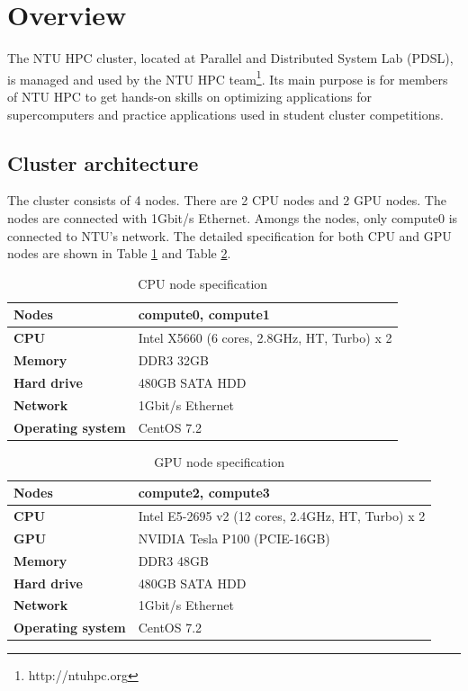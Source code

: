 \section{Overview}

The NTU HPC cluster, located at Parallel and Distributed System Lab (PDSL), is managed and used by the NTU HPC team\footnote{http://ntuhpc.org}. Its main purpose is for members of NTU HPC to get hands-on skills on optimizing applications for supercomputers and practice applications used in student cluster competitions.

\subsection{Cluster architecture}

The cluster consists of 4 nodes. There are 2 CPU nodes and 2 GPU nodes. The nodes are connected with 1Gbit/s Ethernet. Amongs the nodes, only compute0 is connected to NTU's network. The detailed specification for both CPU and GPU nodes are shown in Table \ref{table:cpu} and Table \ref{table:gpu}.

\begin{table}[ht]
\centering
\caption{CPU node specification}
\label{table:cpu}
\begin{tabular}{|l|l|}
\hline
\textbf{Nodes}      & compute0, compute1                       \\ \hline
\textbf{CPU}        & Intel X5660 (6 cores, 2.8GHz, HT, Turbo) x 2 \\ \hline
\textbf{Memory}     & DDR3 32GB                                \\ \hline
\textbf{Hard drive} & 480GB SATA HDD                           \\ \hline
\textbf{Network}    & 1Gbit/s Ethernet                         \\ \hline
\textbf{Operating system} & CentOS 7.2                         \\ \hline
\end{tabular}
\end{table}

\begin{table}[ht]
\centering
\caption{GPU node specification}
\label{table:gpu}
\begin{tabular}{|l|l|}
\hline
\textbf{Nodes}      & compute2, compute3                             \\ \hline
\textbf{CPU}        & Intel E5-2695 v2 (12 cores, 2.4GHz, HT, Turbo) x 2 \\ \hline
\textbf{GPU}        & NVIDIA Tesla P100 (PCIE-16GB)                  \\ \hline
\textbf{Memory}     & DDR3 48GB                                      \\ \hline
\textbf{Hard drive} & 480GB SATA HDD                                 \\ \hline
\textbf{Network}    & 1Gbit/s Ethernet                               \\ \hline
\textbf{Operating system} & CentOS 7.2                         \\ \hline
\end{tabular}
\end{table}


